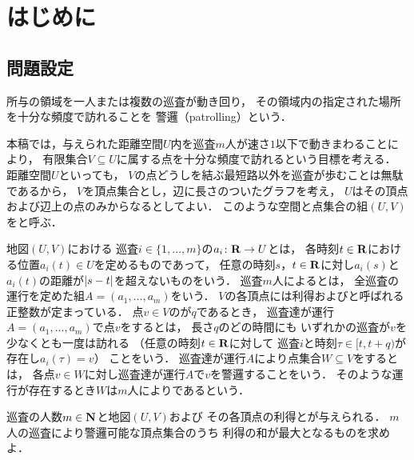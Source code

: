 \chapter{はじめに}
\label{chapter: introduction}

\section{問題設定}
\label{section: problemDefinition}
所与の領域を一人または複数の巡査が動き回り，
その領域内の指定された場所を十分な頻度で訪れることを
警邏（patrolling）という\cite{
  Dumitrescu:2014:CGC:2636805.2636822,
  chen2013fence,
  coene2011charlemagne,
  czyzowicz2011boundary}．

本稿では，与えられた距離空間$U$内を巡査$m$人が速さ$1$以下で動きまわることにより，
有限集合$V \subseteq U$に属する点を十分な頻度で訪れるという目標を考える．
距離空間$U$といっても，
$V$の点どうしを結ぶ最短路以外を巡査が歩むことは無駄であるから，
$V$を頂点集合とし，辺に長さのついたグラフを考え，
$U$はその頂点および辺上の点のみからなるとしてよい．
このような空間と点集合の組$(U, V)$をと呼ぶ．

地図$(U, V)$における
巡査$i \in \{1, \ldots, m\}$の$a _i \colon \mathbf R \to U$とは，
各時刻$t \in \mathbf R$における位置$a _i (t) \in U$を定めるものであって，
任意の時刻$s$，$t \in \mathbf R$に対し$a _i (s)$と$a _i (t)$の距離が$\lvert{s - t}\rvert$を超えないものをいう．
巡査$m$人によるとは，
全巡査の運行を定めた組$A = (a _1, \dots, a _m)$をいう．
$V$の各頂点には利得および{\maxIdletime}と呼ばれる正整数が定まっている．
点$v \in V$の{\maxIdletime}が$q$であるとき，
巡査達が運行$A = (a _1, \dots, a _m)$で点$v$をするとは，
長さ$q$のどの時間にも
いずれかの巡査が$v$を少なくとも一度は訪れる
（任意の時刻$t \in \mathbf R$に対して
巡査$i$と時刻$\tau \in [t, t + q)$が存在し$a _i (\tau) = v$）
ことをいう．
巡査達が運行$A$により点集合$W \subseteq V$をするとは，
各点$v \in W$に対し巡査達が運行$A$で$v$を警邏することをいう．
そのような運行が存在するとき$W$は$m$人によりであるという．

\begin{patrollingProblem}
  巡査の人数$m \in \mathbf N$と地図$(U, V)$および
  その各頂点の利得と{\maxIdletime}が与えられる．
  $m$人の巡査により警邏可能な頂点集合のうち
  利得の和が最大となるものを求めよ．
\end{patrollingProblem}

